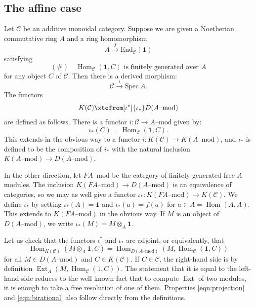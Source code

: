 \documentclass[12pt]{amsart}
\numberwithin{equation}{section}
\theoremstyle{definition}
\theoremstyle{remark}
\DeclareMathOperator{\Hom}{Hom}
\DeclareMathOperator{\Ext}{Ext}
\newcommand{\cat}{\mathcal{C}}
\renewcommand{\1}{\mathbf{1}}
\newcommand{\End}{\mathrm{End}}
\newcommand{\spec}{\mathrm{Spec}}
\begin{document}
\subsection{The affine case}
\label{sub:aff}

Let \(\cat\) be an additive monoidal category. Suppose we are given a Noetherian commutative ring $A$ and a ring homomorphism
\begin{equation}
\label{eqn:affine}
A \stackrel{f}\longrightarrow \End_\cat(\1)
\end{equation}
satisfying 
$$
(\#) \quad \Hom_\cat(\1,C) \text{ is finitely generated over }A
$$
for any object $C$ of $ \cat$. 
Then there is a derived morphism:
\begin{equation}
\label{eqn:affine0}
 \cat \stackrel{\iota}\longrightarrow  \spec \ A.
\end{equation}
The functors
$$
K(\cat) \xtofrom[\iota^*]{\iota_*} D(A\text{--mod})
$$
are defined as follows. There is a functor
\(i: \cat \to A \text{--mod}\)  given by:
\begin{equation}
\label{eqn:push0}
\iota_* (C) = \Hom_{\cat}(\1,C).
\end{equation}
This extends in the obvious way to a functor \(i: K(\cat) \to K(A \text{--mod})\), and \(\iota_*\) is defined to be the composition of \(i_*\) with the natural inclusion \( K(A \text{--mod}) \to D(A \text{--mod})\). 

In the other direction, let \(FA \text{--mod}\) be the category of finitely generated free \(A\) modules. 
The inclusion \( K(FA \text{--mod}) \to D(A \text{--mod})\) is an equivalence of categories, so we may as 
well give a functor \( \iota_* : K(FA \text{--mod}) \to K(\cat)\). %
We define \(\iota_*\) by setting 
\(\iota_*(A) = \1\) and \(\iota_*(a) = f(a)\) for \(a \in A = \Hom(A,A)\). This extends to  \(K(FA \text{--mod})\) in 
the obvious way.  If \(M\) is an object of \(D(A \text{--mod})\), we write
\(\iota_*(M) = M \otimes_A \1\). 

Let us check that the functors \(\iota^*\) and \(\iota_*\) are adjoint, or equivalently, that 
\begin{equation}
\label{eqn:adj0}
\Hom_{K(\cat)}(M \otimes_A \1, C) = \Hom_{D(A\text{--mod})}(M, \Hom_{\cat}(\1,C))
\end{equation}
for all $M \in D(A\text{--mod})$ and $C\in K(\cat)$. If \(C \in \cat\), the right-hand side is by definition 
\(\Ext_A(M,\Hom_{\cat}(1,C))\). The statement that it is equal to the left-hand side reduces to the  well known fact that to compute \(\Ext\) of two modules, it is enough to take a free resolution of one of them. %
Properties \eqref{eqn:projection} and \eqref{eqn:birational} also follow directly from the definitions.
\end{document}
